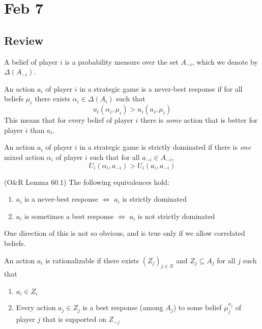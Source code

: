 \documentclass[10pt]{article}
\begin{document}
\section{Feb 7}

\subsection{Review}

\begin{definition}
	A belief of player $i$ is a probability measure over the set $A_{-i}$, which we denote by $\Delta(A_{-i})$.
\end{definition}

\begin{definition}
	An action $a_i$ of player $i$ in a strategic game is a never-best response if for all beliefs $\mu_i$ there exists $\alpha_i \in \Delta(A_{i})$ such that \[u_i(\alpha_i,\mu_i) > u_i(a_i,\mu_i)\]This means that for every belief of player $i$ there is \emph{some} action that is better for player $i$ than $a_{i}$.
\end{definition}

\begin{definition}
	An action $a_i$ of player $i$ in a strategic game is strictly dominated if there is \emph{one} mixed action $\alpha_i$ of player $i$ such that for all $a_{-i} \in A_{-i}$,\[U_i(\alpha_i,a_{-i}) > U_i(a_i,a_{-i})\]
\end{definition}

\begin{lemma}
	(O\&R Lemma 60.1) The following equivalences hold: \begin{enumerate} \item $a_i$ is a never-best response $\Longleftrightarrow$ $a_i$ is strictly dominated \item $a_i$ is sometimes a best response $\Longleftrightarrow$ $a_i$ is not strictly dominated \end{enumerate}
\end{lemma}
\begin{remark}
	One direction of this is not so obvious, and is true only if we allow correlated beliefs.
\end{remark}

\begin{definition}
	An action $a_i$ is rationalizable if there exists $(Z_j)_{j\in N}$ and $Z_j \subseteq A_j$ for all $j$ such that \begin{enumerate} \item $a_i \in Z_i$ \item Every action $a_j \in Z_j$ is a best response (among $A_j$) to some belief $\mu_j^{a_j}$ of player $j$ that is supported on $Z_{-j}$ \end{enumerate}
\end{definition}
\end{document}
